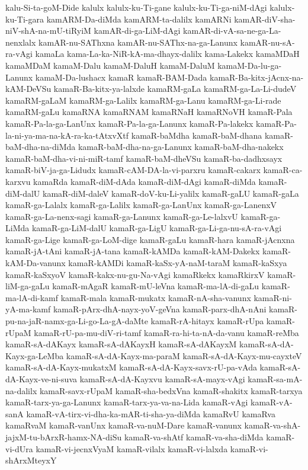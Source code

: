 {kalu-Si-ta-goM-Dide
kalulx
kalulx-ku-Ti-gane
kalulx-ku-Ti-ga-niM-dAgi
kalulx-ku-Ti-gara
kamARM-Da-diMda
kamARM-ta-dalilx
kamARNi
kamAR-diV-sha-niV-shA-na-mU-tiRyiM
kamAR-di-ga-LiM-dAgi
kamAR-di-vA-sa-ne-ga-La-nenxlalx
kamAR-nu-SAThxna
kamAR-nu-SAThx-na-ga-Lanunx
kamAR-nu-sA-ra-vAgi
kamaLa
kama-La-ka-NiR-kA-ma-dhayx-dalilx
kama-Lakekx
kamaMDaH
kamaMDaM
kamaM-Dalu
kamaM-DaluH
kamaM-DaluM
kamaM-Da-lu-ga-Lanunx
kamaM-Da-lushacx
kamaR
kamaR-BAM-Dada
kamaR-Ba-kitx-jAcnx-na-kAM-DeVSu
kamaR-Ba-kitx-ya-lalxde
kamaRM-gaLa
kamaRM-ga-La-Li-dudeV
kamaRM-gaLaM
kamaRM-ga-Lalilx
kamaRM-ga-Lanu
kamaRM-ga-Li-rade
kamaRM-gaLu
kamaRNA
kamaRNAM
kamaRNaH
kamaRNoVH
kamaR-Pala
kamaR-Pa-la-ga-LanUnx
kamaR-Pa-la-ga-Lanunx
kamaR-Pa-lakekx
kamaR-Pa-la-ni-ya-ma-na-kA-ra-ka-tAtxvXtf
kamaR-baMdha
kamaR-baM-dhana
kamaR-baM-dha-na-diMda
kamaR-baM-dha-na-ga-Lanunx
kamaR-baM-dha-nakekx
kamaR-baM-dha-vi-ni-miR-tamf
kamaR-baM-dheVSu
kamaR-ba-dadhxsayx
kamaR-biV-ja-ga-Lidudx
kamaR-cAM-DA-la-vi-parxru
kamaR-cakarx
kamaR-ca-karxvu
kamaRda
kamaR-diM-dAda
kamaR-diM-dAgi
kamaR-diMda
kamaR-diM-dalU
kamaR-diM-daleV
kamaR-doV-ku-Li-yalilx
kamaR-gaLU
kamaR-gaLa
kamaR-ga-Lalalx
kamaR-ga-Lalilx
kamaR-ga-LanUnx
kamaR-ga-LanenxV
kamaR-ga-La-nenx-sagi
kamaR-ga-Lanunx
kamaR-ga-Le-lalxvU
kamaR-ga-LiMda
kamaR-ga-LiM-dalU
kamaR-ga-LigU
kamaR-ga-Li-ga-nu-sA-ra-vAgi
kamaR-ga-Lige
kamaR-ga-LoM-dige
kamaR-gaLu
kamaR-hara
kamaR-jAcnxna
kamaR-jA-tAni
kamaR-jA-tana
kamaR-kAMDa
kamaR-kAM-Dakekx
kamaR-kAM-Da-vanunx
kamaR-kAMDi
kamaR-kaSx-yA-naM-taraM
kamaR-kaSxya
kamaR-kaSxyoV
kamaR-kakx-nu-gu-Na-vAgi
kamaRkekx
kamaRkirxV
kamaR-liM-ga-gaLu
kamaR-mAgaR
kamaR-mU-leVna
kamaR-ma-lA-di-gaLu
kamaR-ma-lA-di-kamf
kamaR-mala
kamaR-mukatx
kamaR-nA-sha-vanunx
kamaR-ni-yA-ma-kamf
kamaR-pArx-dhA-nayx-yoV-geVna
kamaR-parx-dhA-nAni
kamaR-pu-na-jaR-namx-ga-Li-go-La-gA-daMte
kamaR-rA-hitayx
kamaR-rUpa
kamaR-rUpaM
kamaR-rU-pa-mu-diV-ri-tamf
kamaR-ra-hi-ta-nA-da-vanu
kamaR-reMba
kamaR-sA-dAKayx
kamaR-sA-dAKayxH
kamaR-sA-dAKayxM
kamaR-sA-dA-Kayx-ga-LeMba
kamaR-sA-dA-Kayx-ma-paraM
kamaR-sA-dA-Kayx-mu-cayxteV
kamaR-sA-dA-Kayx-mukatxM
kamaR-sA-dA-Kayx-savx-rU-pa-vAda
kamaR-sA-dA-Kayx-ve-ni-suva
kamaR-sA-dA-Kayxvu
kamaR-sA-mayx-vAgi
kamaR-sa-mA-na-dalilx
kamaR-savx-rUpaM
kamaR-sha-bedxVna
kamaR-shakitx
kamaR-tarxya
kamaR-tarx-ya-ga-Lanunx
kamaR-tarx-ya-va-na-Lida
kamaR-vAgi
kamaR-vA-sanA
kamaR-vA-tirx-vi-dha-ka-mAR-ti-sha-ya-diMda
kamaRvU
kamaRva
kamaRvaM
kamaR-vanUnx
kamaR-va-nuM-Dare
kamaR-vanunx
kamaR-va-shA-jajxM-tu-bArxR-hamx-NA-diSu
kamaR-va-shAtf
kamaR-va-sha-diMda
kamaR-vi-dUra
kamaR-vi-jecnxVyaM
kamaR-vilalx
kamaR-vi-lalxda
kamaR-vi-shArxMteyxY
}
